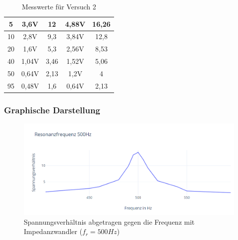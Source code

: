 \documentclass{article}
\begin{document}
\begin{table}[h]
\begin{center}
\begin{tabular}{|c|c|c|c|c|}
      \hline
      5          & 3,6V                                              & 12                                             & 4,88V       & 16,26                             \\
      \hline
      10         & 2,8V                                              & 9,3                                            & 3,84V       & 12,8                              \\
      \hline
      20         & 1,6V                                              & 5,3                                            & 2,56V       & 8,53                              \\
      \hline
      40         & 1,04V                                             & 3,46                                           & 1,52V       & 5,06                              \\
      \hline
      50         & 0,64V                                             & 2,13                                           & 1,2V        & 4                                 \\
      \hline
      95         & 0,48V                                             & 1,6                                            & 0,64V       & 2,13                              \\
      \hline
    \end{tabular}
    \caption{Messwerte für Versuch 2}
    \label{tab:MV2}
  \end{center}
\end{table}

\subsubsection{Graphische Darstellung}
\begin{figure}[h]
  \begin{center}
    \includegraphics[scale=0.75]{../assets/images/ETP3/Fre500Plot3.PNG}
    \caption{Spannungsverhältnis abgetragen gegen die Frequenz mit Impedanzwandler ($f_r = 500Hz$)}
  \end{center}
\end{figure}
\end{document}
